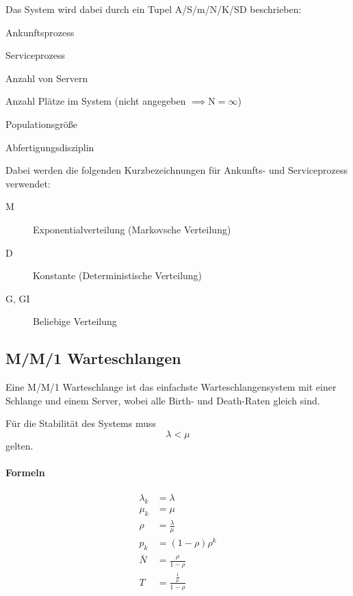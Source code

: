 \documentclass[a4paper, 11pt, accentcolor = tud3b]{tudreport}
\begin{document}
			Das System wird dabei durch ein Tupel A/S/m/N/K/SD beschrieben:
			\begin{description}[leftmargin = 1cm]
				\item[A] Ankunftsprozess
				\item[S] Serviceprozess
				\item[m] Anzahl von Servern
				\item[N] Anzahl Plätze im System (nicht angegeben \( \implies \text{N} = \infty \))
				\item[K] Populationsgröße
				\item[SD] Abfertigungsdisziplin
			\end{description}
			Dabei werden die folgenden Kurzbezeichnungen für Ankunfts- und Serviceprozess verwendet:
			\begin{description}
				\item[M] Exponentialverteilung (Markovsche Verteilung)
				\item[D] Konstante (Deterministische Verteilung)
				\item[G, GI] Beliebige Verteilung
			\end{description}
			
			\subsection{M/M/1 Warteschlangen} %
				Eine M/M/1 Warteschlange ist das einfachste Warteschlangensystem mit einer Schlange und einem Server, wobei alle Birth- und Death-Raten gleich sind.
				
				Für die Stabilität des Systems muss \[ \lambda < \mu \] gelten.
				
				\paragraph{Formeln}
					\begin{align*}
						\lambda _ k & = \lambda                        \\
						\mu _ k     & = \mu                            \\
						\rho        & = \frac{\lambda}{\mu}            \\
						p _ k       & = (1 - \rho) \rho ^ k            \\
						\bar{N}     & = \frac{\rho}{1 - \rho}          \\
						T           & = \frac{\frac{1}{\mu}}{1 - \rho}
					\end{align*}
			
\end{document}

